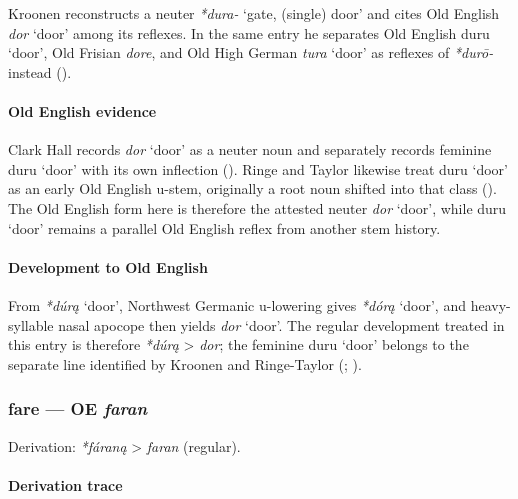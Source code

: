 \documentclass[
  british,
  a4paper,
]{article}
\providecommand{\Recon}[1]{\emph{*#1}}
\begin{document}
Kroonen reconstructs a neuter \emph{*dura-} `gate, (single) door' and
cites Old English {\emph{dor}} `door' among its reflexes. In the same
entry he separates Old English {duru} `door', Old Frisian \emph{dore},
and Old High German {\emph{tura}} `door' as reflexes of \emph{*durō-}
instead ().

\paragraph{Old English evidence}\label{old-english-evidence-14}

Clark Hall records {\emph{dor}} `door' as a neuter noun and separately
records feminine {duru} `door' with its own inflection
(). Ringe and Taylor
likewise treat {duru} `door' as an early Old English u-stem, originally
a root noun shifted into that class
(). The Old English
form here is therefore the attested neuter {\emph{dor}} `door', while
{duru} `door' remains a parallel Old English reflex from another stem
history.

\paragraph{Development to Old
English}\label{development-to-old-english-14}

From \Recon{dúrą} `door', Northwest Germanic u-lowering gives
\Recon{dórą} `door', and heavy-syllable nasal apocope then yields
{\emph{dor}} `door'. The regular development treated in this entry is
therefore \emph{*dúrą} \textgreater{} \emph{dor}; the feminine {duru}
`door' belongs to the separate line identified by Kroonen and
Ringe-Taylor (;
).

\subsubsection{\texorpdfstring{fare --- OE
\emph{faran}}{fare --- OE faran}}\label{fare-oe-faran}

Derivation: \emph{*fáraną} \textgreater{} \emph{faran} (regular).

\paragraph{Derivation trace}\label{derivation-trace-16}
\end{document}
